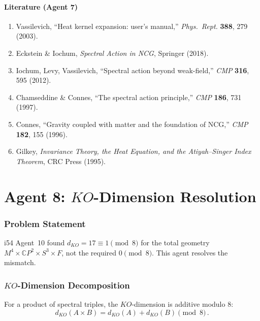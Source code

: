 \documentclass[11pt,a4paper]{article}
\newcommand{\CP}{\mathbb{C}P}
\begin{document}
\subsection{Literature (Agent 7)}

\begin{enumerate}
\item Vassilevich, ``Heat kernel expansion: user's manual,'' \textit{Phys.\ Rept.} \textbf{388}, 279 (2003).
\item Eckstein \& Iochum, \textit{Spectral Action in NCG}, Springer (2018).
\item Iochum, Levy, Vassilevich, ``Spectral action beyond weak-field,'' \textit{CMP} \textbf{316}, 595 (2012).
\item Chamseddine \& Connes, ``The spectral action principle,'' \textit{CMP} \textbf{186}, 731 (1997).
\item Connes, ``Gravity coupled with matter and the foundation of NCG,'' \textit{CMP} \textbf{182}, 155 (1996).
\item Gilkey, \textit{Invariance Theory, the Heat Equation, and the Atiyah--Singer Index Theorem}, CRC Press (1995).
\end{enumerate}


\part{Agent 8: $KO$-Dimension Resolution}
\label{part:ko-dim}

\section{Problem Statement}

i54 Agent~10 found $d_{KO} = 17 \equiv 1 \pmod{8}$ for the total geometry $M^4 \times \CP^2 \times S^3 \times F$, not the required $0 \pmod{8}$. This agent resolves the mismatch.

\section{$KO$-Dimension Decomposition}

For a product of spectral triples, the $KO$-dimension is additive modulo 8:
\begin{equation}
d_{KO}(A \times B) = d_{KO}(A) + d_{KO}(B) \pmod{8}\,.
\end{equation}
\end{document}
